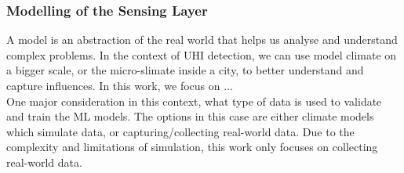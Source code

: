 
\subsubsection{Modelling of the Sensing Layer}

A model is an abstraction of the real world that helps us analyse and understand complex problems. In the context of UHI detection, we can use model climate on a bigger scale, or the micro-slimate inside a city, to better understand and capture influences. In this work, we focus on ...\\
One major consideration in this context, what type of data is used to validate and train the ML models. The options in this case are either climate models which simulate data, or capturing/collecting real-world data. Due to the complexity and limitations of simulation, this work only focuses on collecting real-world data.



